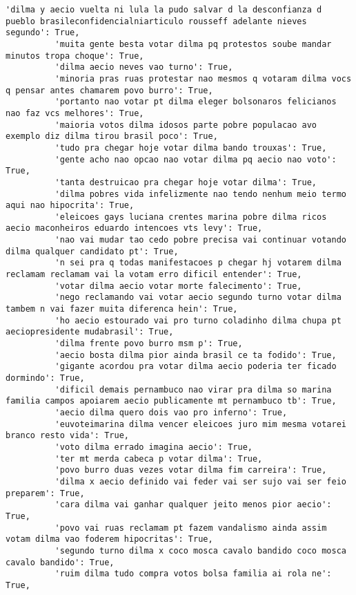 \documentclass[11pt]{article}
\begin{document}
\begin{Verbatim}[commandchars=\\\{\}]
          'dilma y aecio vuelta ni lula la pudo salvar d la desconfianza d pueblo brasileconfidencialniarticulo rousseff adelante nieves segundo': True,
          'muita gente besta votar dilma pq protestos soube mandar minutos tropa choque': True,
          'dilma aecio neves vao turno': True,
          'minoria pras ruas protestar nao mesmos q votaram dilma vocs q pensar antes chamarem povo burro': True,
          'portanto nao votar pt dilma eleger bolsonaros felicianos nao faz vcs melhores': True,
          'maioria votos dilma idosos parte pobre populacao avo exemplo diz dilma tirou brasil poco': True,
          'tudo pra chegar hoje votar dilma bando trouxas': True,
          'gente acho nao opcao nao votar dilma pq aecio nao voto': True,
          'tanta destruicao pra chegar hoje votar dilma': True,
          'dilma pobres vida infelizmente nao tendo nenhum meio termo aqui nao hipocrita': True,
          'eleicoes gays luciana crentes marina pobre dilma ricos aecio maconheiros eduardo intencoes vts levy': True,
          'nao vai mudar tao cedo pobre precisa vai continuar votando dilma qualquer candidato pt': True,
          'n sei pra q todas manifestacoes p chegar hj votarem dilma reclamam reclamam vai la votam erro dificil entender': True,
          'votar dilma aecio votar morte falecimento': True,
          'nego reclamando vai votar aecio segundo turno votar dilma tambem n vai fazer muita diferenca hein': True,
          'ho aecio estourado vai pro turno coladinho dilma chupa pt aeciopresidente mudabrasil': True,
          'dilma frente povo burro msm p': True,
          'aecio bosta dilma pior ainda brasil ce ta fodido': True,
          'gigante acordou pra votar dilma aecio poderia ter ficado dormindo': True,
          'dificil demais pernambuco nao virar pra dilma so marina familia campos apoiarem aecio publicamente mt pernambuco tb': True,
          'aecio dilma quero dois vao pro inferno': True,
          'euvoteimarina dilma vencer eleicoes juro mim mesma votarei branco resto vida': True,
          'voto dilma errado imagina aecio': True,
          'ter mt merda cabeca p votar dilma': True,
          'povo burro duas vezes votar dilma fim carreira': True,
          'dilma x aecio definido vai feder vai ser sujo vai ser feio preparem': True,
          'cara dilma vai ganhar qualquer jeito menos pior aecio': True,
          'povo vai ruas reclamam pt fazem vandalismo ainda assim votam dilma vao foderem hipocritas': True,
          'segundo turno dilma x coco mosca cavalo bandido coco mosca cavalo bandido': True,
          'ruim dilma tudo compra votos bolsa familia ai rola ne': True,

\end{Verbatim}
\end{document}
